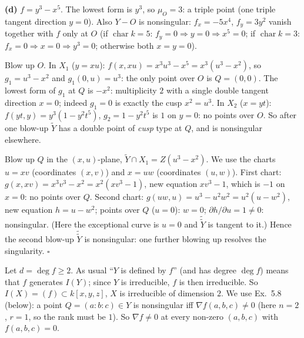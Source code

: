 \documentclass[11pt]{article}
\begin{document}
\textbf{(d)} $f=y^3-x^5$. The lowest form is $y^3$, so $\mu_O=3$: a triple point (one triple tangent direction $y=0$). Also $Y-O$ is nonsingular: $f_x=-5x^4$, $f_y=3y^2$ vanish together with $f$ only at $O$ (if $\operatorname{char}k=5$: $f_y=0\Rightarrow y=0\Rightarrow x^5=0$; if $\operatorname{char}k=3$: $f_x=0\Rightarrow x=0\Rightarrow y^3=0$; otherwise both $x=y=0$).

Blow up $O$. In $X_1$ ($y=xu$): $f(x,xu)=x^3u^3-x^5=x^3(u^3-x^2)$, so $g_1=u^3-x^2$ and $g_1(0,u)=u^3$: the only point over $O$ is $Q=(0,0)$. The lowest form of $g_1$ at $Q$ is $-x^2$: multiplicity $2$ with a single double tangent direction $x=0$; indeed $g_1=0$ is exactly the cusp $x^2=u^3$. In $X_2$ ($x=yt$): $f(yt,y)=y^3(1-y^2t^5)$, $g_2=1-y^2t^5$ is $1$ on $y=0$: no points over $O$. So after one blow-up $\widetilde Y$ has a double point of \emph{cusp} type at $Q$, and is nonsingular elsewhere.

Blow up $Q$ in the $(x,u)$-plane, $\widetilde Y\cap X_1=Z(u^3-x^2)$. We use the charts $u=xv$ (coordinates $(x,v)$) and $x=uw$ (coordinates $(u,w)$). First chart: $g(x,xv)=x^3v^3-x^2=x^2(xv^3-1)$, new equation $xv^3-1$, which is $-1$ on $x=0$: no points over $Q$. Second chart: $g(uw,u)=u^3-u^2w^2=u^2(u-w^2)$, new equation $h=u-w^2$; points over $Q$ ($u=0$): $w=0$; $\partial h/\partial u=1\ne0$: nonsingular. (Here the exceptional curve is $u=0$ and $\widetilde{\widetilde Y}$ is tangent to it.) Hence the second blow-up $\widetilde{\widetilde Y}$ is nonsingular: one further blowing up resolves the singularity. \hfill$\square$

\pf
Let $d=\deg f\ge2$. As usual ``$Y$ is defined by $f$'' (and has degree $\deg f$) means that $f$ generates $I(Y)$; since $Y$ is irreducible, $f$ is then irreducible. So $I(X)=(f)\subset k[x,y,z]$, $X$ is irreducible of dimension $2$. We use Ex.~5.8 (below): a point $Q=(a:b:c)\in Y$ is nonsingular iff $\nabla f(a,b,c)\neq0$ (here $n=2$, $r=1$, so the rank must be $1$). So $\nabla f\neq0$ at every non-zero $(a,b,c)$ with $f(a,b,c)=0$.
\end{document}
